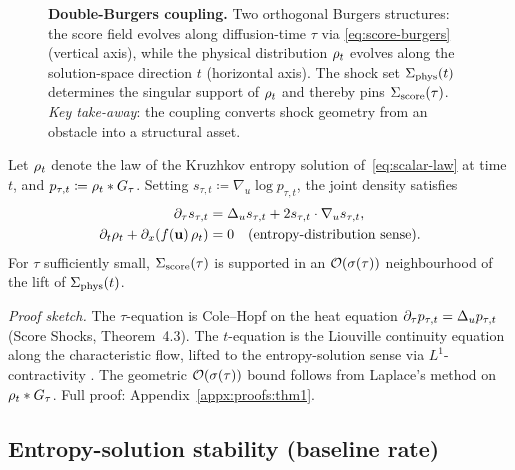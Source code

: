 \begin{theorem}
\label{thm:double-burgers}

\begin{figure}[t]
    \centering
    \fbox{\rule[-.5cm]{0cm}{3.0cm} \rule[-.5cm]{0.8\textwidth}{0cm}}
    \caption{\textbf{Double-Burgers coupling.} Two orthogonal Burgers
      structures: the score field evolves along diffusion-time $\tau$ via
      \eqref{eq:score-burgers} (vertical axis), while the physical
      distribution $\rho_{t}$ evolves along the solution-space direction
      $t$ (horizontal axis). The shock set $\Sigma_{\mathrm{phys}}(t)$ determines the
      singular support of $\rho_{t}$ and thereby pins $\Sigma_{\mathrm{score}}(\tau)$.
      \emph{Key take-away}: the coupling converts shock geometry from an
      obstacle into a structural asset.}
    \label{fig:double-burgers}
\end{figure}

Let $\rho_{t}$ denote the law of the Kruzhkov entropy solution of~\eqref{eq:scalar-law} at time $t$, and $p_{\tau,t}\coloneqq\rho_{t}\ast G_{\tau}$. Setting $s_{\tau,t}\coloneqq\nabla_u\log p_{\tau,t}$, the joint density satisfies
\begin{align}
  \label{eq:dburg-system}
  \partial_{\tau} s_{\tau,t} &= \Delta_u s_{\tau,t} + 2s_{\tau,t}\cdot\nabla_u s_{\tau,t}, \\
  \partial_{t}\rho_{t} + \partial_{x}(f(\mathbf{u})\,\rho_{t}) &= 0 \quad \text{(entropy-distribution sense)}. \notag
\end{align}
For $\tau$ sufficiently small, $\Sigma_{\mathrm{score}}(\tau)$ is supported in an $\mathcal{O}(\sigma(\tau))$ neighbourhood of the lift of $\Sigma_{\mathrm{phys}}(t)$.
\end{theorem}

\textit{Proof sketch.} The $\tau$-equation is Cole--Hopf on the heat equation $\partial_{\tau} p_{\tau,t}=\Delta_u p_{\tau,t}$ (Score Shocks, Theorem~4.3). The $t$-equation is the Liouville continuity equation along the characteristic flow, lifted to the entropy-solution sense via $L^{1}$-contractivity \citep{kruzhkov1970}. The geometric $\mathcal{O}(\sigma(\tau))$ bound follows from Laplace's method on $\rho_{t}\ast G_{\tau}$. Full proof: Appendix~\ref{appx:proofs:thm1}.

\subsection{Entropy-solution stability (baseline rate)}
\label{sec:theory:stability}

